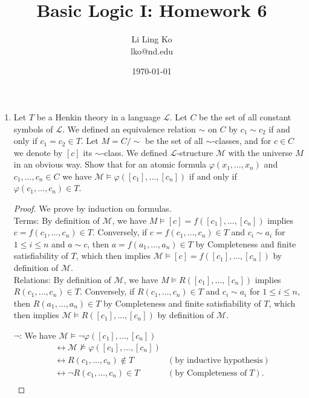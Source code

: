 \documentclass{article}
\begin{document}
\title{Basic Logic I: Homework 6}
\author{Li Ling Ko\\ lko@nd.edu}
\date{\today}
\maketitle

\begin{enumerate}[label={\bf Q\arabic*:}]
  \item Let $T$ be a Henkin theory in a language $\mathcal{L}$. Let $C$ be
    the set of all constant symbols of $\mathcal{L}$. We defined an
    equivalence relation $\sim$ on $C$ by $c_1\sim c_2$ if and only if
    $c_1=c_2\in T$. Let $M=C/\sim$ be the set of all $\sim$-classes, and
    for $c\in C$ we denote by $[c]$ its $\sim$-class. We defined
    $\mathcal{L}$-structure $\mathcal{M}$ with the universe $M$ in an
    obvious way. Show that for an atomic formula
    $\varphi(x_1,\ldots,x_n)$ and $c_1,\ldots,c_n\in C$ we have
    $\mathcal{M}\models\varphi([c_1],\ldots,[c_n])$ if and only if
    $\varphi(c_1,\ldots,c_n)\in T$.

    \begin{proof}
      We prove by induction on formulas. \\

      Terms: By definition of $\mathcal{M}$, we have $M\models
      [c]=f([c_1],\ldots,[c_n])$ implies $c=f(c_1,\ldots,c_n)\in T$.
      Conversely, if $c=f(c_1,\ldots,c_n)\in T$ and
      $c_i\sim a_i$ for $1\leq i\leq n$ and $a\sim c$, then
      $a=f(a_1,\ldots,a_n)\in T$ by Completeness and finite satisfiability
      of $T$, which then implies $\mathcal{M}\models
      [c]=f([c_1],\ldots,[c_n])$ by definition of $\mathcal{M}$. \\

      Relations: By definition of $\mathcal{M}$, we have $M\models
      R([c_1],\ldots,[c_n])$ implies $R(c_1,\ldots,c_n)\in T$. Conversely,
      if $R(c_1,\ldots,c_n)\in T$ and $c_i\sim a_i$
      for $1\leq i\leq n$, then $R(a_1,\ldots,a_n)\in T$ by Completeness
      and finite satisfiability of $T$, which then implies
      $\mathcal{M}\models R([c_1],\ldots,[c_n])$ by definition of
      $\mathcal{M}$.

      $\neg$: We have $\mathcal{M}\models\neg\varphi([c_1],\ldots,[c_n])$
      \begin{align*}
          &\leftrightarrow
            \mathcal{M}\not\models\varphi([c_1],\ldots,[c_n]) &\\
          &\leftrightarrow R(c_1,\ldots,c_n)\not\in T & (\text{by inductive
            hypothesis}) \\
          &\leftrightarrow \neg R(c_1,\ldots,c_n)\in T & (\text{by
            Completeness of}\; T). \\
      \end{align*}


\end{proof}
\end{enumerate}
\end{document}
